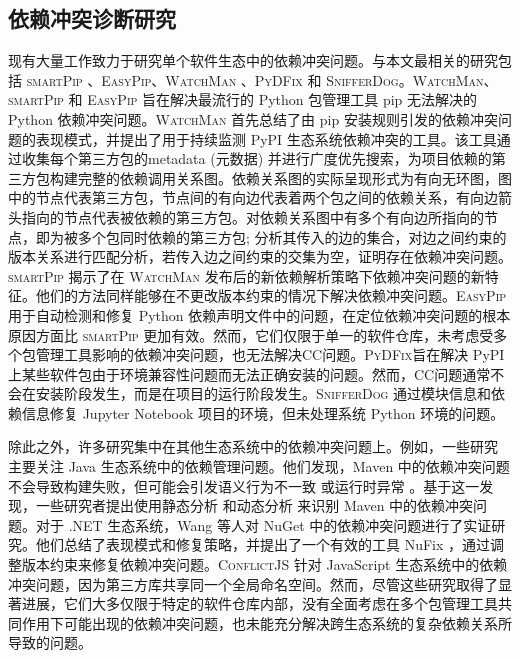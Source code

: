 \subsection{依赖冲突诊断研究}
现有大量工作致力于研究单个软件生态中的依赖冲突问题。与本文最相关的研究包括 \textsc{smartPip} 、\textsc{EasyPip}、\textsc{WatchMan} 、\textsc{PyDFix} 和 \textsc{SnifferDog}。\textsc{WatchMan}、\textsc{smartPip} 和 \textsc{EasyPip} 旨在解决最流行的 Python 包管理工具 pip 无法解决的 Python 依赖冲突问题。\textsc{WatchMan} 首先总结了由 pip 安装规则引发的依赖冲突问题的表现模式，并提出了用于持续监测 PyPI 生态系统依赖冲突的工具。该工具通过收集每个第三方包的metadata (元数据) 并进行广度优先搜索，为项目依赖的第三方包构建完整的依赖调用关系图。依赖关系图的实际呈现形式为有向无环图，图中的节点代表第三方包，节点间的有向边代表着两个包之间的依赖关系，有向边箭头指向的节点代表被依赖的第三方包。对依赖关系图中有多个有向边所指向的节点，即为被多个包同时依赖的第三方包; 分析其传入的边的集合，对边之间约束的版本关系进行匹配分析，若传入边之间约束的交集为空，证明存在依赖冲突问题。\textsc{smartPip} 揭示了在 \textsc{WatchMan} 发布后的新依赖解析策略下依赖冲突问题的新特征。他们的方法同样能够在不更改版本约束的情况下解决依赖冲突问题。\textsc{EasyPip} 用于自动检测和修复 Python 依赖声明文件中的问题，在定位依赖冲突问题的根本原因方面比 \textsc{smartPip} 更加有效。然而，它们仅限于单一的软件仓库，未考虑受多个包管理工具影响的依赖冲突问题，也无法解决CC问题。\textsc{PyDFix}旨在解决 PyPI 上某些软件包由于环境兼容性问题而无法正确安装的问题。然而，CC问题通常不会在安装阶段发生，而是在项目的运行阶段发生。\textsc{SnifferDog} 通过模块信息和依赖信息修复 Jupyter Notebook 项目的环境，但未处理系统 Python 环境的问题。

除此之外，许多研究集中在其他生态系统中的依赖冲突问题上。例如，一些研究  主要关注 Java 生态系统中的依赖管理问题。他们发现，Maven 中的依赖冲突问题不会导致构建失败，但可能会引发语义行为不一致  或运行时异常 。基于这一发现，一些研究者提出使用静态分析 和动态分析  来识别 Maven 中的依赖冲突问题。对于 .NET 生态系统，Wang 等人对 NuGet 中的依赖冲突问题进行了实证研究。他们总结了表现模式和修复策略，并提出了一个有效的工具 NuFix ，通过调整版本约束来修复依赖冲突问题。\textsc{ConflictJS} 针对 JavaScript 生态系统中的依赖冲突问题，因为第三方库共享同一个全局命名空间。然而，尽管这些研究取得了显著进展，它们大多仅限于特定的软件仓库内部，没有全面考虑在多个包管理工具共同作用下可能出现的依赖冲突问题，也未能充分解决跨生态系统的复杂依赖关系所导致的问题。
